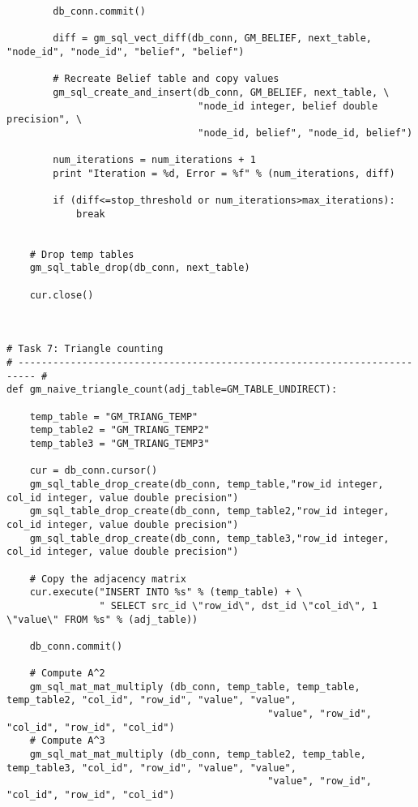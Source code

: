 \documentclass[11pt]{article}
\begin{document}
\begin{lstlisting}
        db_conn.commit()
        
        diff = gm_sql_vect_diff(db_conn, GM_BELIEF, next_table, "node_id", "node_id", "belief", "belief")
        
        # Recreate Belief table and copy values
        gm_sql_create_and_insert(db_conn, GM_BELIEF, next_table, \
                                 "node_id integer, belief double precision", \
                                 "node_id, belief", "node_id, belief")
                             
        num_iterations = num_iterations + 1
        print "Iteration = %d, Error = %f" % (num_iterations, diff)        
        
        if (diff<=stop_threshold or num_iterations>max_iterations):
            break
        
        
    # Drop temp tables
    gm_sql_table_drop(db_conn, next_table)

    cur.close()


  
# Task 7: Triangle counting
# ------------------------------------------------------------------------- #
def gm_naive_triangle_count(adj_table=GM_TABLE_UNDIRECT):

    temp_table = "GM_TRIANG_TEMP"
    temp_table2 = "GM_TRIANG_TEMP2"
    temp_table3 = "GM_TRIANG_TEMP3"
    
    cur = db_conn.cursor()
    gm_sql_table_drop_create(db_conn, temp_table,"row_id integer, col_id integer, value double precision")
    gm_sql_table_drop_create(db_conn, temp_table2,"row_id integer, col_id integer, value double precision")
    gm_sql_table_drop_create(db_conn, temp_table3,"row_id integer, col_id integer, value double precision")    
    
    # Copy the adjacency matrix
    cur.execute("INSERT INTO %s" % (temp_table) + \
                " SELECT src_id \"row_id\", dst_id \"col_id\", 1 \"value\" FROM %s" % (adj_table))
    
    db_conn.commit()
    
    # Compute A^2
    gm_sql_mat_mat_multiply (db_conn, temp_table, temp_table, temp_table2, "col_id", "row_id", "value", "value", 
                                             "value", "row_id", "col_id", "row_id", "col_id")
    # Compute A^3
    gm_sql_mat_mat_multiply (db_conn, temp_table2, temp_table, temp_table3, "col_id", "row_id", "value", "value", 
                                             "value", "row_id", "col_id", "row_id", "col_id")
    

\end{lstlisting}
\end{document}
